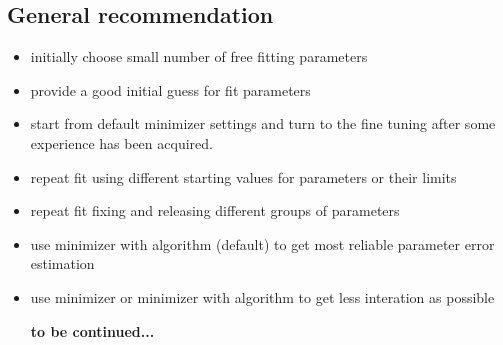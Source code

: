 \subsection*{General recommendation}
\begin{itemize}
\item initially choose small number of free fitting parameters
\item provide a good initial guess for fit parameters
\item start from default minimizer settings and turn to the fine tuning after some experience has been acquired.
\item repeat fit using different starting values for parameters or their limits
\item repeat fit fixing and releasing different groups  of parameters
\item use  minimizer with  algorithm (default) to get most reliable parameter error estimation
\item use  minimizer or  minimizer with  algorithm to get less interation as possible




{\bf to be continued... }


\end{itemize}

